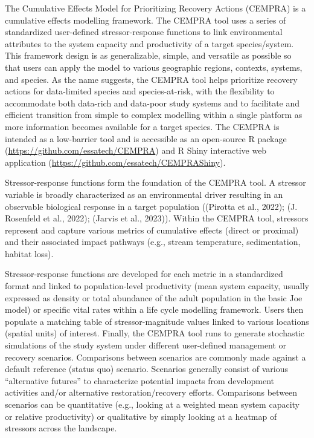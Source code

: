 \documentclass[
  letterpaper,
  DIV=11,
  numbers=noendperiod]{scrreprt}
\begin{document}
The Cumulative Effects Model for Prioritizing Recovery Actions (CEMPRA)
is a cumulative effects modelling framework. The CEMPRA tool uses a
series of standardized user-defined stressor-response functions to link
environmental attributes to the system capacity and productivity of a
target species/system. This framework design is as generalizable,
simple, and versatile as possible so that users can apply the model to
various geographic regions, contexts, systems, and species. As the name
suggests, the CEMPRA tool helps prioritize recovery actions for
data-limited species and species-at-risk, with the flexibility to
accommodate both data-rich and data-poor study systems and to facilitate
and efficient transition from simple to complex modelling within a
single platform as more information becomes available for a target
species. The CEMPRA is intended as a low-barrier tool and is accessible
as an open-source R package (\url{https://github.com/essatech/CEMPRA})
and R Shiny interactive web application
(\url{https://github.com/essatech/CEMPRAShiny}).

Stressor-response functions form the foundation of the CEMPRA tool. A
stressor variable is broadly characterized as an environmental driver
resulting in an observable biological response in a target population
((Pirotta et al., 2022); (J. Rosenfeld et al., 2022); (Jarvis et al.,
2023)). Within the CEMPRA tool, stressors represent and capture various
metrics of cumulative effects (direct or proximal) and their associated
impact pathways (e.g., stream temperature, sedimentation, habitat loss).

Stressor-response functions are developed for each metric in a
standardized format and linked to population-level productivity (mean
system capacity, usually expressed as density or total abundance of the
adult population in the basic Joe model) or specific vital rates within
a life cycle modelling framework. Users then populate a matching table
of stressor-magnitude values linked to various locations (spatial units)
of interest. Finally, the CEMPRA tool runs to generate stochastic
simulations of the study system under different user-defined management
or recovery scenarios. Comparisons between scenarios are commonly made
against a default reference (status quo) scenario. Scenarios generally
consist of various ``alternative futures'' to characterize potential
impacts from development activities and/or alternative
restoration/recovery efforts. Comparisons between scenarios can be
quantitative (e.g., looking at a weighted mean system capacity or
relative productivity) or qualitative by simply looking at a heatmap of
stressors across the landscape.
\end{document}
